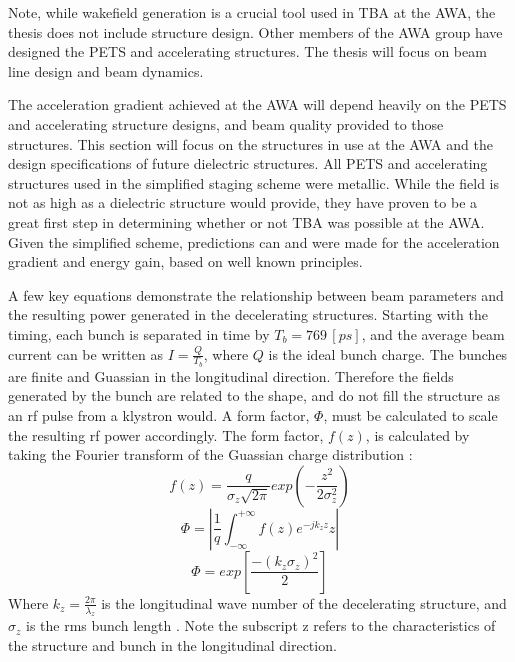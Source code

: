 Note, while wakefield generation is a crucial tool used in TBA at the AWA, the thesis does not include 
structure design. Other members of the AWA group have designed the PETS and accelerating
structures. The thesis will focus on beam line design and beam dynamics. 



The acceleration gradient achieved at the AWA will depend heavily 
on the PETS and accelerating structure designs, and beam quality 
provided to those structures. This section will focus on the 
structures in use at the AWA and the design specifications of future 
dielectric structures. All PETS and accelerating structures 
used in the simplified staging scheme were metallic. 
While the field is not as high as a dielectric structure would provide,
they have proven to be a great first step 
in determining whether or not TBA was possible at the AWA. Given 
the simplified scheme, predictions can and were made for the acceleration 
gradient and energy gain, based on well known principles. 

A few key equations demonstrate the relationship between beam 
parameters and the resulting power generated in the decelerating structures.  
Starting with the timing, each bunch is separated
in time by $T_{b}=769\,[ps]$, and the average beam current can be written as $I=\frac{Q}{T_{b}}$, 
where $Q$ is the ideal bunch charge.
The bunches are finite and Guassian in the longitudinal direction. Therefore the fields 
generated by the bunch are related to the shape, and do not fill the structure as an
rf pulse from a klystron would.  A form factor, $\Phi$, 
must be calculated to scale the resulting rf power accordingly. 
The form factor, $f(z)$, is calculated 
by taking the Fourier transform of the Guassian charge distribution \cite{PETSeq}: 
\begin{equation}
f\left(z\right) = \frac{q}{\sigma_z \sqrt{2\pi}}exp\left(-\frac{z^2}{2\sigma^2_z}\right)
\end{equation}   
\begin{equation}
\Phi = \left|\frac{1}{q}\int_{-\infty}^{+\infty}f\left(z\right)e^{-jk_z z}z\right|
\end{equation}
\begin{equation}
\Phi=exp\left[\frac{-(k_{z}\sigma_{z})^{2}}{2}\right]
\end{equation}
Where $k_{z}=\frac{2\pi}{\lambda_{z}}$ is the longitudinal wave number
of the decelerating structure, and $\sigma_{z}$ is the rms bunch length \cite{PETSeq}. 
Note the subscript z refers to the characteristics of the structure and bunch in the longitudinal
direction. 

